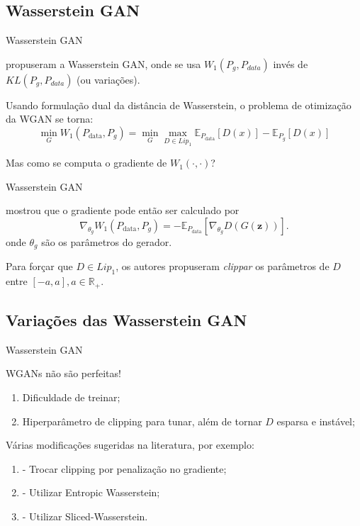 \documentclass[10pt]{beamer}
\begin{document}
\subsection{Wasserstein GAN}
\begin{frame}[fragile]{Wasserstein GAN}

	\citet{arjovsky2017wasserstein} propuseram a Wasserstein GAN,
	onde se usa $W_1(P_g, P_{data})$ invés de $KL(P_g, P_{data})$ (ou variações).

	\vspace{3mm}
	Usando formulação dual da distância de Wasserstein, o problema de otimização
	da WGAN se torna:
	\begin{displaymath}
		\min_{G} W_1(P_{\text{data}},P_g) = \min_{G}
		\max_{D \in Lip_1}\mathbb E_{P_{\text{data}}}[D(x)]
		-\mathbb E_{P_{g}}[D(x)]
		\label{eq:wgan}
	\end{displaymath}

	\vspace{3mm}
	Mas como se computa o gradiente de $W_1(\cdot, \cdot)$?

\end{frame}

\begin{frame}[fragile]{Wasserstein GAN}

	\citet{arjovsky2017wasserstein} mostrou que o gradiente pode então ser calculado
	por
	\begin{displaymath}
		\nabla_{\theta_g} W_1(P_{\text{data}},P_g) = - \mathbb E_{P_{\text{data}}}[\nabla_{\theta_g} D(G(\mathbf z))].
	\end{displaymath}
	onde $\theta_g$ são os parâmetros do gerador.

	Para forçar que $D \in Lip_1$,
	os autores propuseram \textit{clippar} os parâmetros de $D$
	entre $[-a,a], a \in \mathbb R_+$.

\end{frame}

\subsection{Variações das Wasserstein GAN}
\begin{frame}[fragile]{Wasserstein GAN}

	WGANs não são perfeitas!
	\begin{enumerate}
		\item Dificuldade de treinar;
		\item Hiperparâmetro de clipping para tunar, além de tornar $D$ esparsa e instável;
	\end{enumerate}

	Várias modificações sugeridas na literatura, por exemplo:
	\begin{enumerate}
		\item \citet{gulrajani2017improved} - Trocar clipping por penalização no gradiente;
		\item \citet{genevay2018learning} - Utilizar Entropic Wasserstein;
		\item \citet{deshpande2018generative} - Utilizar Sliced-Wasserstein.
	\end{enumerate}

\end{frame}
\end{document}

